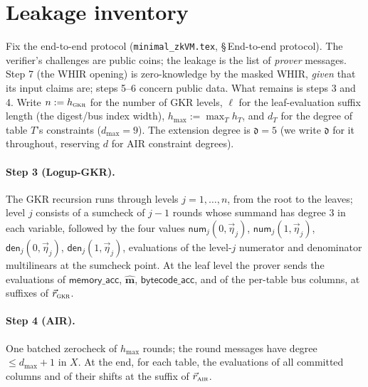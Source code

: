 \documentclass{article}
\newcommand{\extdeg}{\mathfrak{d}}
\newcommand{\num}{\mathsf{num}}
\newcommand{\den}{\mathsf{den}}
\theoremstyle{definition}
\begin{document}
\section{Leakage inventory}\label{sec:leakage}

Fix the end-to-end protocol (\texttt{minimal\_zkVM.tex}, \S\,End-to-end protocol). The verifier's challenges are public coins; the leakage is the list of \emph{prover} messages. Step 7 (the WHIR opening) is zero-knowledge by the masked WHIR, \emph{given} that its input claims are; steps 5--6 concern public data. What remains is steps 3 and 4. Write $n := h_\textsc{gkr}$ for the number of GKR levels, $\ell$ for the leaf-evaluation suffix length (the digest/bus index width), $h_{\max} := \max_T h_T$, and $d_T$ for the degree of table $T$'s constraints ($d_{\max} = 9$). The extension degree is $\extdeg = 5$ (we write $\extdeg$ for it throughout, reserving $d$ for AIR constraint degrees).

\paragraph{Step 3 (Logup-GKR).} The GKR recursion runs through levels $j = 1, \dots, n$, from the root to the leaves; level $j$ consists of a sumcheck of $j - 1$ rounds whose summand has degree $3$ in each variable, followed by the four values $\num_j(0, \vec\eta_j)$, $\num_j(1, \vec\eta_j)$, $\den_j(0, \vec\eta_j)$, $\den_j(1, \vec\eta_j)$, evaluations of the level-$j$ numerator and denominator multilinears at the sumcheck point. At the leaf level the prover sends the evaluations of $\textsf{memory\_acc}$, $\hat{\textbf{m}}$, $\textsf{bytecode\_acc}$, and of the per-table bus columns, at suffixes of $\vec r_\textsc{gkr}$.

\paragraph{Step 4 (AIR).} One batched zerocheck of $h_{\max}$ rounds; the round messages have degree $\leq d_{\max} + 1$ in $X$. At the end, for each table, the evaluations of all committed columns and of their shifts at the suffix of $\vec r_\textsc{air}$.
\end{document}
